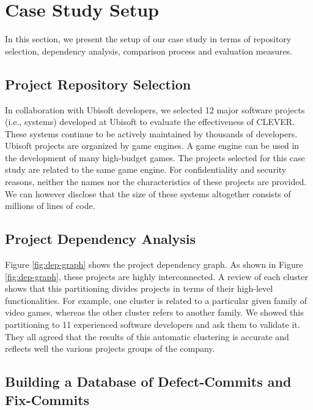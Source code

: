 \documentclass[sigconf]{acmart}
\begin{document}
\section{Case Study Setup}\label{sec:exp}

In this section, we present the setup of our case study in terms of
repository selection, dependency analysis, comparison process and
evaluation measures.

\subsection{Project Repository Selection}\label{sec:rep}

In collaboration with Ubisoft developers, we selected 12 major software
projects (i.e., systems) developed at Ubisoft to evaluate the
effectiveness of CLEVER. These systems continue to be actively
maintained by thousands of developers. Ubisoft projects are organized by
game engines. A game engine can be used in the development of many
high-budget games. The projects selected for this case study are related
to the same game engine. For confidentiality and security reasons,
neither the names nor the characteristics of these projects are
provided. We can however disclose that the size of these systems
altogether consists of millions of lines of code.

\subsection{Project Dependency Analysis}\label{sec:dependencies}

Figure \ref{fig:dep-graph} shows the project dependency graph. As shown
in Figure \ref{fig:dep-graph}, these projects are highly interconnected.
A review of each cluster shows that this partitioning divides projects
in terms of their high-level functionalities. For example, one cluster
is related to a particular given family of video games, whereas the
other cluster refers to another family. We showed this partitioning to
11 experienced software developers and ask them to validate it. They all
agreed that the results of this automatic clustering is accurate and
reflects well the various projects groups of the company.

\subsection{Building a Database of Defect-Commits and
Fix-Commits}\label{sub:golden}
\end{document}
